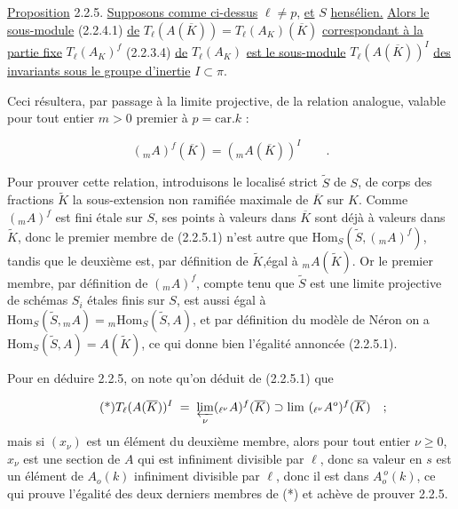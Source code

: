 \underline{Proposition} 2.2.5. \underline{Supposons comme ci-dessus} $\ell \neq p$, \underline{et} $S$ \underline{hensélien.} \underline{Alors le sous-module} (2.2.4.1) \underline{de} $T_{\ell}(A(\overline{K})) = T_{\ell}(A_{K})(\overline{K})$ \underline{correspondant à la partie fixe} $T_{\ell}(A_{K})^{f}$ (2.2.3.4) \underline{de} $T_{\ell}(A_{K})$ \underline{est le sous-module} $T_{\ell}(A(\overline{K}))^{I}$ \underline{des invariants sous le groupe d'inertie} $I \subset \pi$.

Ceci résultera, par passage à la limite projective, de la relation analogue, valable pour tout entier $m > 0$ premier à $p = \mathrm{car}.k$ :

\begin{equation}\tag{2.2.5.1}
({}_{m}A)^{f}(\overline{K}) = ({}_{m}A(\overline{K}))^{I} \qquad .
\end{equation}



Pour prouver cette relation, introduisons le localisé strict $\tilde{S}$ de $S$, de corps des fractions $\tilde{K}$ la sous-extension non ramifiée maximale de $\overline{K}$ sur $K$. Comme $({}_{m}A)^{f}$ est fini étale sur $S$, ses points à valeurs dans $\overline{K}$ sont déjà à valeurs dans $\tilde{K}$, donc le premier membre de (2.2.5.1) n'est autre que $\mathrm{Hom}_{S}(\tilde{S} , ({}_{m}A)^{f})$, tandis que le deuxième est, par définition de $\tilde{K}$,égal à ${}_{m}A(\tilde{K})$. Or le premier membre, par définition de $({}_{m}A)^{f}$, compte tenu que $\tilde{S}$ est une limite projective de schémas $S_{i}$ étales finis sur $S$, est aussi égal à $\mathrm{Hom}_{S}(\tilde{S} , {}_{m}A) = {}_{m}\mathrm{Hom}_{S}(\tilde{S},A)$, et par définition du modèle de Néron on a $\mathrm{Hom}_{S}(\tilde{S},A) = A(\tilde{K})$, ce qui donne bien l'égalité annoncée (2.2.5.1).

Pour en déduire 2.2.5, on note qu'on déduit de (2.2.5.1) que

\begin{equation}\tag{*}
T_{\ell}(A(\overline{K}))^{I} \;=\; \varprojlim_{\nu} ({}_{\ell^{\nu}}A)^{f}(\overline{K}) \supset \lim\ ({}_{\ell^{\nu}}A^{o})^{f}(\overline{K}) \quad ;
\end{equation}
mais si $(x_{\nu})$ est un élément du deuxième membre, alors pour tout entier $\nu \geq 0$, $x_{\nu}$ est une section de $A$ qui est infiniment divisible par $\ell$, donc sa valeur en $s$ est un élément de $A_{o}(k)$ infiniment divisible par $\ell$, donc il est dans $A_{o}^{\,o}(k)$, ce qui prouve l'égalité des deux derniers membres de (*) et achève de prouver 2.2.5.

